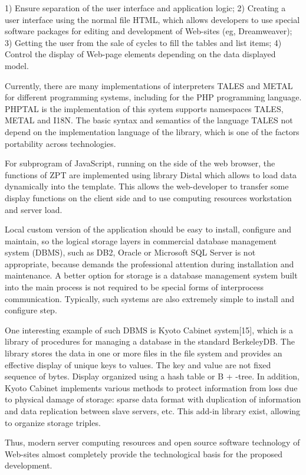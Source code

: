 \documentclass[conference]{IEEEtran}
\begin{document}
1) Ensure separation of the user interface and application logic;
2) Creating a user interface using the normal file HTML, which allows developers to use special software packages for editing and development of Web-sites (eg, Dreamweaver);
3) Getting the user from the sale of cycles to fill the tables and list items;
4) Control the display of Web-page elements depending on the data displayed model.

	Currently, there are many implementations of interpreters TALES and METAL for different programming systems, including for the PHP programming language. PHPTAL is the implementation of this system supports namespaces TALES, METAL and I18N. The basic syntax and semantics of the language TALES not depend on the implementation language of the library, which is one of the factors portability across technologies.

	For subprogram of JavaScript, running on the side of the web browser, the functions of ZPT are implemented using library Distal which allows to load data dynamically into the template. This allows the web-developer to transfer some display functions on the client side and to use computing resources workstation and server load.

	Local custom version of the application should be easy to install, configure and maintain, so the logical storage layers in commercial database management system (DBMS), such as DB2, Oracle or Microsoft SQL Server is not appropriate, because demands the professional attention during installation and maintenance. A better option for storage is a database management system built into the main process is not required to be special forms of interprocess communication. Typically, such systems are also extremely simple to install and configure step.

	One interesting example of such DBMS is Kyoto Cabinet system[15], which is a library of procedures for managing a database in the standard BerkeleyDB. The library stores the data in one or more files in the file system and provides an effective display of unique keys to values. The key and value are not fixed sequence of bytes. Display organized using a hash table or B + -tree. In addition, Kyoto Cabinet implements various methods to protect information from loss due to physical damage of storage: sparse data format with duplication of information and data replication between slave servers, etc. This add-in library exist, allowing to organize storage triples.

	Thus, modern server computing resources and open source software technology of Web-sites almost completely provide the technological basis for the proposed development.
\end{document}
